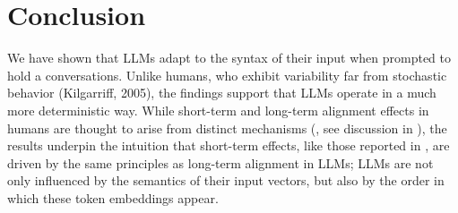 \documentclass[11pt]{article}
\begin{document}

\section{Conclusion}
We have shown that LLMs adapt to the syntax of their input when prompted to hold a conversations. 
Unlike humans, who exhibit variability far from stochastic behavior (Kilgarriff, 2005), the findings support that LLMs operate in a much more deterministic way. While short-term and long-term alignment effects in humans are thought to arise from distinct mechanisms (\citealp{Reitter2014}, see discussion in \citealp{Rasenberg2020framework}), the results underpin the intuition that short-term effects, like those reported in \citealp{cai2024largelanguagemodelsresemble}, are driven by the same principles as long-term alignment in LLMs; LLMs are not only influenced by the semantics of their input vectors, but also by the order in which these token embeddings appear.
\end{document}

